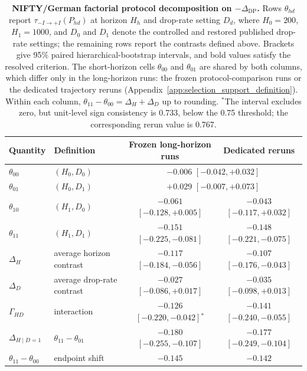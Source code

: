 \begin{table}[t]
\centering
\caption{\textbf{NIFTY/German factorial protocol decomposition on \(-\Delta_{\mathrm{DP}}\).}
Rows \(\theta_{hd}\) report \(\tau_{-I\rightarrow +I}(P_{hd})\) at horizon \(H_h\) and drop-rate setting \(D_d\), where \(H_0=200\), \(H_1=1000\), and \(D_0\) and \(D_1\) denote the controlled and restored published drop-rate settings; the remaining rows report the contrasts defined above.
Brackets give 95\% paired hierarchical-bootstrap intervals, and bold values satisfy the resolved criterion.
The short-horizon cells \(\theta_{00}\) and \(\theta_{01}\) are shared by both columns, which differ only in the long-horizon runs: the frozen protocol-comparison runs or the dedicated trajectory reruns (Appendix~\ref{app:selection_support_definition}).
Within each column, \(\theta_{11}-\theta_{00}=\Delta_H+\Delta_D\) up to rounding.
\(^{\ast}\)The interval excludes zero, but unit-level sign consistency is 0.733, below the 0.75 threshold; the corresponding rerun value is 0.767.
}
\label{tab:nifty_factorial}
\vspace{-0.2cm}
\scriptsize
\setlength{\tabcolsep}{6pt}
\renewcommand{\arraystretch}{1.1}
\begin{tabular}{@{}llcc@{}}
\toprule
Quantity & Definition & Frozen long-horizon runs & Dedicated reruns \\
\midrule
\(\theta_{00}\) & \((H_0,D_0)\) & \multicolumn{2}{c}{\(-0.006\) \([-0.042, +0.032]\)} \\
\(\theta_{01}\) & \((H_0,D_1)\) & \multicolumn{2}{c}{\(+0.029\) \([-0.007, +0.073]\)} \\
\(\theta_{10}\) & \((H_1,D_0)\) & \(-0.061\) \([-0.128, +0.005]\) & \(-0.043\) \([-0.117, +0.032]\) \\
\(\theta_{11}\) & \((H_1,D_1)\) & \(\mathbf{-0.151}\) \([-0.225, -0.081]\) & \(\mathbf{-0.148}\) \([-0.221, -0.075]\) \\
\midrule
\(\Delta_H\) & average horizon contrast & \(\mathbf{-0.117}\) \([-0.184, -0.056]\) & \(\mathbf{-0.107}\) \([-0.176, -0.043]\) \\
\(\Delta_D\) & average drop-rate contrast & \(-0.027\) \([-0.086, +0.017]\) & \(-0.035\) \([-0.098, +0.013]\) \\
\(\Gamma_{HD}\) & interaction & \(-0.126\) \([-0.220, -0.042]\)\(^{\ast}\) & \(\mathbf{-0.141}\) \([-0.240, -0.055]\) \\
\(\Delta_{H\mid D=1}\) & \(\theta_{11}-\theta_{01}\) & \(\mathbf{-0.180}\) \([-0.255, -0.107]\) & \(\mathbf{-0.177}\) \([-0.249, -0.104]\) \\
\midrule
\(\theta_{11}-\theta_{00}\) & endpoint shift & \(-0.145\) & \(-0.142\) \\
\bottomrule
\end{tabular}
\end{table}
